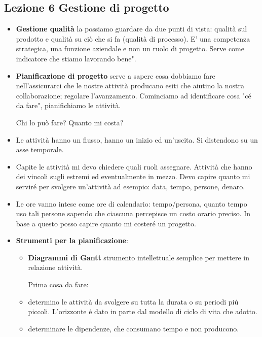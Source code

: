 \documentclass[a4paper,10pt] {article}
\begin{document}
\begin{itemize}
\section{Lezione 6 Gestione di progetto}
\begin{itemize}

\item \textbf{Gestione qualità} la possiamo guardare da due punti di vista: 
qualità sul prodotto e qualità su ciò che si fa (qualità di processo). 
E' una competenza strategica, una funzione aziendale e non un ruolo di progetto.
Serve come indicatore che stiamo lavorando bene". 


\item \textbf{Pianificazione di progetto} serve a sapere cosa dobbiamo fare 
nell'assicurarci che le nostre attività producano esiti che aiutino la nostra 
collaborazione; regolare l'avanzamento. 
Cominciamo ad identificare cosa "cé da fare", pianifichiamo le attività.

Chi lo può fare? 
Quanto mi costa? 

\item Le attività hanno un 
flusso, hanno un inizio ed un'uscita. Si 
distendono su un asse temporale.

\item Capite le attività mi devo chiedere quali ruoli assegnare. Attività 
che hanno dei vincoli sugli estremi ed eventualmente in mezzo. Devo capire 
quanto mi serviré per svolgere un'attività ad esempio: data,
tempo, persone, denaro.

\item Le ore vanno intese come ore di calendario: 
tempo/persona, quanto tempo uso tali persone sapendo che ciascuna percepisce un 
costo orario preciso. In base a questo posso capire quanto mi costeré un 
progetto.

\item \textbf{Strumenti per la pianificazione}:
\begin{itemize}

\item \textbf{Diagrammi di Gantt} strumento intellettuale semplice per mettere 
in relazione attività. 

Prima cosa da fare: 

\item determino le attività da svolgere su tutta la durata o su periodi 
pi\'u piccoli. L'orizzonte é dato in parte dal modello di ciclo di vita che 
adotto.

\item determinare le dipendenze, che consumano tempo e non producono. 


\end{itemize}
\end{itemize}
\end{itemize}
\end{document}
